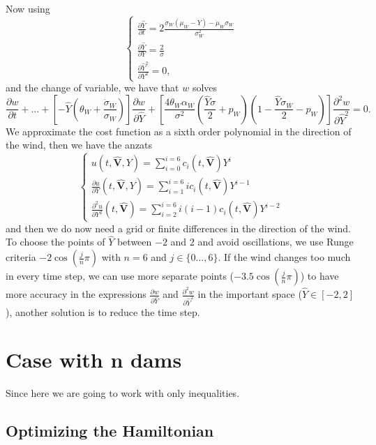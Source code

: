 \documentclass[12pt]{article}
\theoremstyle{definition}
\theoremstyle{remark}
\begin{document}
Now using
\begin{equation*}
\begin{cases}
\frac{\partial\hat{Y}}{\partial t}=2\frac{\dot{\sigma}_W(\mu_W-Y)-\dot{\mu}_W\sigma_W}{\sigma_W^2}\\
\frac{\partial\hat{Y}}{\partial Y}=\frac{2}{\sigma}\\
\frac{\partial\hat{Y}^2}{\partial Y^2}=0,
\end{cases}
\end{equation*}
and the change of variable, we have that $w$ solves
\begin{equation*}
\frac{\partial w}{\partial t}+\dots+\left[-\hat{Y}\left(\theta_W+\frac{\dot{\sigma}_W}{\sigma_W}\right)\right]\frac{\partial w}{\partial\hat{Y}}+\left[\frac{4\theta_W\alpha_W}{\sigma^2}\left(\frac{\hat{Y}\sigma}{2}+p_W\right)\left(1-\frac{\hat{Y}\sigma_W}{2}-p_W\right)\right]\frac{\partial^2w}{\partial \hat{Y}^2}=0.
\end{equation*}
We approximate the cost function as a sixth order polynomial in the direction of the wind, then we have the anzats
\begin{equation*}
\begin{cases}
u(t,\bm{\hat{V}},Y)=\sum_{i=0}^{i=6}c_i(t,\bm{\hat{V}})Y^i\\
\frac{\partial u}{\partial Y}(t,\bm{\hat{V}},Y)=\sum_{i=1}^{i=6}ic_i(t,\bm{\hat{V}})Y^{i-1}\\
\frac{\partial^2u}{\partial Y^2}(t,\bm{\hat{V}})=\sum_{i=2}^{i=6}i(i-1)c_i(t,\bm{\hat{V}})Y^{i-2}
\end{cases}
\end{equation*}
and then we do now need a grid or finite differences in the direction of the wind. To choose the points of $\hat{Y}$ between $-2$ and $2$ and avoid oscillations, we use Runge criteria $-2\cos(\frac{j}{n}\pi)$ with $n=6$ and $j\in\{0\dots,6\}$. If the wind changes too much in every time step, we can use more separate points ($-3.5\cos(\frac{j}{n}\pi)$) to have more accuracy in the expressions $\frac{\partial w}{\partial \hat{Y}}$ and $\frac{\partial^2 w}{\partial \hat{Y}^2}$ in the important space ($\hat{Y}\in[-2,2]$), another solution is to reduce the time step.

\section{Case with n dams}

Since here we are going to work with only inequalities.

\subsection{Optimizing the Hamiltonian}
\end{document}
